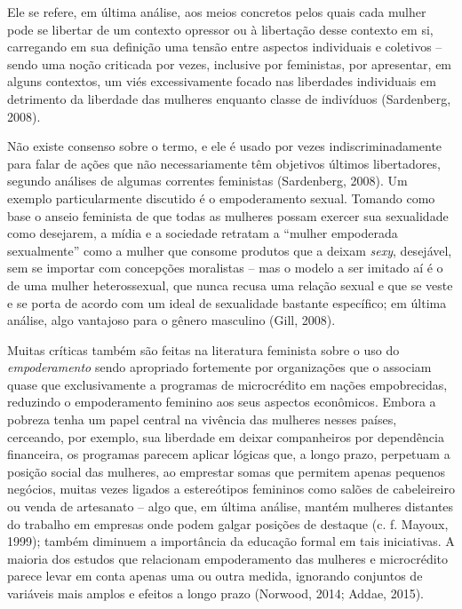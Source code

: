 Ele se refere, em última análise, aos meios concretos pelos quais cada mulher pode se libertar de um contexto opressor ou à libertação desse contexto em si, carregando em sua definição uma tensão entre aspectos individuais e coletivos – sendo uma noção criticada por vezes, inclusive por feministas, por apresentar, em alguns contextos, um viés excessivamente focado nas liberdades individuais em detrimento da liberdade das mulheres enquanto classe de indivíduos (Sardenberg, 2008). 

Não existe consenso sobre o termo, e ele é usado por vezes indiscriminadamente para falar de ações que não necessariamente têm objetivos últimos libertadores, segundo análises de algumas correntes feministas (Sardenberg, 2008). Um exemplo particularmente discutido é o empoderamento sexual. Tomando como base o anseio feminista de que todas as mulheres possam exercer sua sexualidade como desejarem, a mídia e a sociedade retratam a “mulher empoderada sexualmente” como a mulher que consome produtos que a deixam \textit{sexy}, desejável, sem se importar com concepções moralistas – mas o modelo a ser imitado aí é o de uma mulher heterossexual, que nunca recusa uma relação sexual e que se veste e se porta de acordo com um ideal de sexualidade bastante específico; em última análise, algo vantajoso para o gênero masculino (Gill, 2008).

Muitas críticas também são feitas na literatura feminista sobre o uso do \textit{empoderamento} sendo apropriado fortemente por organizações que o associam quase que exclusivamente a programas de microcrédito em nações empobrecidas, reduzindo o empoderamento feminino aos seus aspectos econômicos. Embora a pobreza tenha um papel central na vivência das mulheres nesses países, cerceando, por exemplo, sua liberdade em deixar companheiros por dependência financeira, os programas parecem aplicar lógicas que, a longo prazo, perpetuam a posição social das mulheres, ao emprestar somas que permitem apenas pequenos negócios, muitas vezes ligados a estereótipos femininos como salões de cabeleireiro ou venda de artesanato – algo que, em última análise, mantém mulheres distantes do trabalho em empresas onde podem galgar posições de destaque (c. f. Mayoux, 1999); também diminuem a importância da educação formal em tais iniciativas. A maioria dos estudos que relacionam empoderamento das mulheres e microcrédito parece levar em conta apenas uma ou outra medida, ignorando conjuntos de variáveis mais amplos e efeitos a longo prazo (Norwood, 2014; Addae, 2015).


